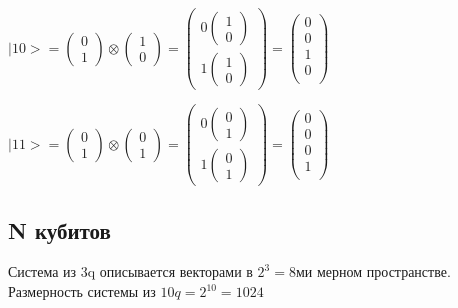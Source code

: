 \documentclass[11pt]{report}
\begin{document}
$|10> = \begin{pmatrix}
0 \\
1
\end{pmatrix}
\otimes
\begin{pmatrix}
1 \\
0
\end{pmatrix}
=
\begin{pmatrix}
0 
\begin{pmatrix}
1 \\
0\end{pmatrix} \\

1 
\begin{pmatrix}
1 \\
0\end{pmatrix}

\end{pmatrix} =
\begin{pmatrix}
0 \\
0 \\
1 \\
0 \\
\end{pmatrix}$

$|11> = \begin{pmatrix}
0 \\
1
\end{pmatrix}
\otimes
\begin{pmatrix}
0 \\
1
\end{pmatrix}
=
\begin{pmatrix}
0 
\begin{pmatrix}
0 \\
1\end{pmatrix} \\

1 
\begin{pmatrix}
0 \\
1\end{pmatrix}

\end{pmatrix} =
\begin{pmatrix}
0 \\
0 \\
0 \\
1 \\
\end{pmatrix}$
\subsection{N кубитов}
Система из 3q описывается векторами в $2^3 = 8$ми мерном пространстве. Размерность системы из $10q=2^{10} = 1024$
\end{document}
